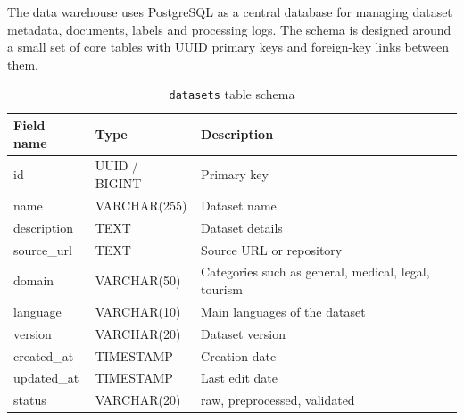 \documentclass[12pt,oneside,openright,a4paper]{cpe-english-project}
\begin{document}
The data warehouse uses PostgreSQL as a central database for managing dataset metadata, documents, labels and processing logs. The schema is designed around a small set of core tables with UUID primary keys and foreign-key links between them.

\begin{table}[H]
\centering
\caption{\texttt{datasets} table schema}\label{tbl:db-datasets}
\begin{tabular}{|p{}|p{}|p{}|}
\hline
\textbf{Field name} & \textbf{Type} & \textbf{Description} \\ \hline
id & UUID / BIGINT & Primary key \\ \hline
name & VARCHAR(255) & Dataset name \\ \hline
description & TEXT & Dataset details \\ \hline
source\_url & TEXT & Source URL or repository \\ \hline
domain & VARCHAR(50) & Categories such as general, medical, legal, tourism \\ \hline
language & VARCHAR(10) & Main languages of the dataset \\ \hline
version & VARCHAR(20) & Dataset version \\ \hline
created\_at & TIMESTAMP & Creation date \\ \hline
updated\_at & TIMESTAMP & Last edit date \\ \hline
status & VARCHAR(20) & raw, preprocessed, validated \\ \hline
\end{tabular}
\end{table}
\end{document}

